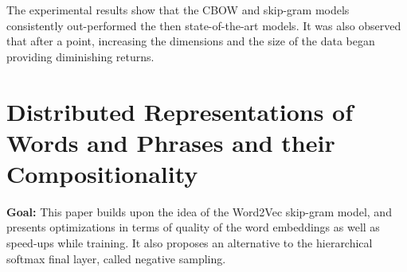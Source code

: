 \documentclass[11pt,a4paper]{article}
\begin{document}
  The experimental results show that the CBOW and skip-gram models consistently out-performed the then state-of-the-art models. It was also observed that after a point, increasing the dimensions and the size of the data began providing diminishing returns.



\section{Distributed Representations of Words and Phrases and their Compositionality} %
\label{sec:distributed_representations_of_words_and_phrases_and_their_compositionality}

  \textbf{Goal:}
  This paper builds upon the idea of the Word2Vec skip-gram model, and presents optimizations in terms of quality of the word embeddings as well as speed-ups while training. It also proposes an alternative to the hierarchical softmax final layer, called negative sampling\cite{mikolov2013distributed}.\\
\end{document}
